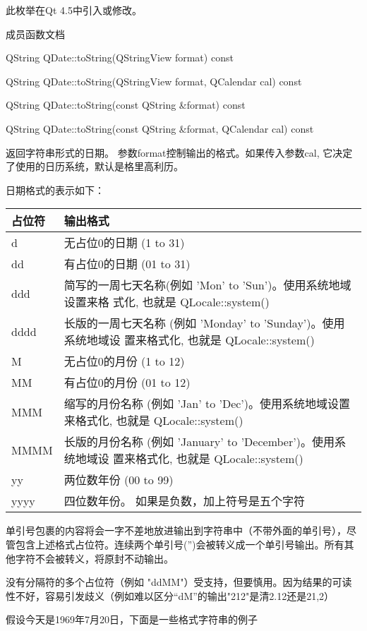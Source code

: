 此枚举在Qt 4.5中引入或修改。

\splitLine

成员函数文档

QString QDate::toString(QStringView format) const

QString QDate::toString(QStringView format, QCalendar cal) const

QString QDate::toString(const QString \&format) const

QString QDate::toString(const QString \&format, QCalendar cal) const

返回字符串形式的日期。 参数format控制输出的格式。如果传入参数cal, 它决定了使用的日历系统，默认是格里高利历。

日期格式的表示如下：

\begin{tabular}{|l|m{30em}|}
\hline
占位符 &	输出格式\\
\hline
d&	无占位0的日期 (1 to 31)\\
\hline
dd&	有占位0的日期 (01 to 31)\\
\hline
ddd&	简写的一周七天名称(例如 'Mon' to 'Sun')。使用系统地域设置来格
     式化, 也就是 QLocale::system()\\
\hline
dddd&	长版的一周七天名称 (例如 'Monday' to 'Sunday')。使用系统地域设
      置来格式化, 也就是 QLocale::system()\\
\hline
M&	无占位0的月份 (1 to 12)\\
\hline
MM&	有占位0的月份 (01 to 12)\\
\hline
MMM&	缩写的月份名称 (例如 'Jan' to 'Dec')。使用系统地域设置来格式化,
     也就是 QLocale::system()\\
\hline
MMMM&	长版的月份名称 (例如 'January' to 'December')。使用系统地域设
      置来格式化, 也就是 QLocale::system()\\
\hline
yy&	两位数年份 (00 to 99)\\
\hline
yyyy&	四位数年份。 如果是负数，加上符号是五个字符\\
\hline
\end{tabular}

单引号包裹的内容将会一字不差地放进输出到字符串中（不带外面的单引号），尽管包含上述格式占位符。连续两个单引号('')会被转义成一个单引号输出。所有其他字符不会被转义，将原封不动输出。

没有分隔符的多个占位符（例如 "ddMM"）受支持，但要慎用。因为结果的可读性不好，容易引发歧义（例如难以区分“dM”的输出"212"是清2.12还是21,2）

假设今天是1969年7月20日，下面是一些格式字符串的例子

